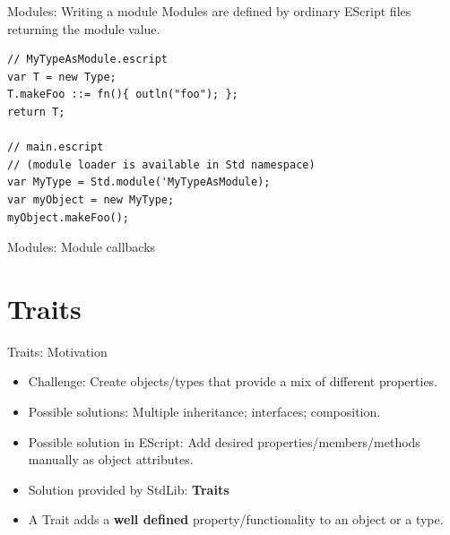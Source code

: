 \documentclass[ucs,9pt]{beamer}
\begin{document}
\begin{frame}[fragile]{Modules: Writing a module}
Modules are defined by ordinary EScript files returning the module value.
\begin{lstlisting}
// MyTypeAsModule.escript
var T = new Type;
T.makeFoo ::= fn(){	outln("foo"); };
return T;

// main.escript
// (module loader is available in Std namespace)
var MyType = Std.module('MyTypeAsModule);
var myObject = new MyType;
myObject.makeFoo();
\end{lstlisting}
 
\end{frame}


\begin{frame}[fragile]{Modules: Module callbacks}
\end{frame}


\section{Traits}

\begin{frame}[fragile]{Traits: Motivation}
\begin{itemize}
\item Challenge: Create objects/types that provide a mix of different properties.
\item Possible solutions: Multiple inheritance; interfaces; composition.
\item Possible solution in EScript: Add desired properties/members/methods manually as object attributes.
\item Solution provided by StdLib: \textbf{Traits} 
\item A Trait adds a \textbf{well defined} property/functionality to an object or a type.
\end{itemize}
\end{frame}
\end{document}
